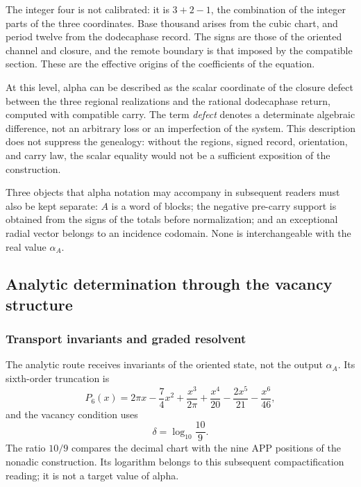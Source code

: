The integer four is not calibrated: it is
\(3+2-1\), the combination of the integer parts of the three coordinates.
Base thousand arises from the cubic chart, and period twelve from the dodecaphase record.
The signs are those of the oriented channel and closure, and the remote boundary is
that imposed by the compatible section. These are the effective origins of
the coefficients of the equation.

At this level, alpha can be described as the scalar coordinate of the
closure defect between the three regional realizations and the
rational dodecaphase return, computed with compatible carry. The term
\emph{defect} denotes a determinate algebraic difference, not an
arbitrary loss or an imperfection of the system. This description does not
suppress the genealogy: without the regions, signed record,
orientation, and carry law, the scalar equality would not be a
sufficient exposition of the construction.

Three objects that alpha notation may accompany in subsequent readers
must also be kept separate: \(A\) is a word of
blocks; the negative pre-carry support is obtained from the signs of the
totals before normalization; and an exceptional radial vector belongs to
an incidence codomain. None is interchangeable with the
real value \(\alpha_A\).






\subsection{Analytic determination through the vacancy structure}
\subsubsection{Transport invariants and graded resolvent}
\label{subsec:alpha-via-b}

The analytic route receives invariants of the oriented state, not the output
\(\alpha_A\). Its sixth-order truncation is
\begin{equation}
 P_6(x)=2\pi x-\frac74x^2
 +\frac{x^3}{2\pi}
 +\frac{x^4}{20}-\frac{2x^5}{21}-\frac{x^6}{46},
 \label{eq:alpha-p6}
\end{equation}
and the vacancy condition uses
\[
 \delta=\log_{10}\frac{10}{9}.
\]
The ratio \(10/9\) compares the decimal chart with the nine APP
positions of the nonadic construction. Its logarithm belongs to this subsequent
compactification reading; it is not a target value of alpha.

